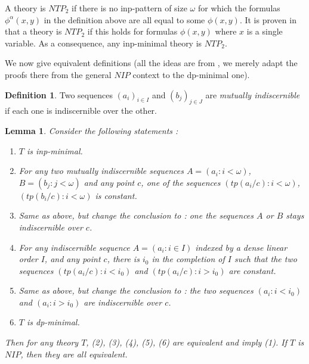 \documentclass[english]{article}
\newtheorem{lemme}[thm]{Lemma}
\theoremstyle{definition}
\newtheorem{defi}[thm]{Definition}
\theoremstyle{mystyle}
\theoremstyle{remark}
\begin{document}
A theory is $NTP_2$ if there is no inp-pattern of size $\omega$ for which the formulas $\phi^\alpha(x,y)$ in the definition above are all equal to some $\phi(x,y)$. It is proven in \cite{ntp2} that a theory is $NTP_2$ if this holds for formulas $\phi(x,y)$ where $x$ is a single variable. As a consequence, any inp-minimal theory is $NTP_2$.

We now give equivalent definitions (all the ideas are from \cite{Sh863}, we merely adapt the proofs there from the general $NIP$ context to the dp-minimal one).

\begin{defi}
Two sequences $(a_i)_{i \in I}$ and $(b_j)_{j\in J}$ are \emph{mutually indiscernible} if each one is indiscernible over the other.
\end{defi}

\begin{lemme}\label{defs}
Consider the following statements : 
\begin{enumerate}
\item $T$ is inp-minimal.
\item For any two mutually indiscernible sequences $A=(a_i : i< \omega)$, $B=(b_j : j<\omega)$ and any point $c$, one of the sequences $(tp(a_i/c) : i < \omega)$, $(tp(b_i/c) : i < \omega)$ is constant.
\item Same as above, but change the conclusion to : one the sequences $A$ or $B$ stays indiscernible over $c$.
\item For any indiscernible sequence $A=(a_i : i \in I)$ indexed by a dense linear order $I$, and any point $c$, there is $i_0$ in the completion of $I$ such that the two sequences $(tp(a_i/c) : i<i_0)$ and $(tp(a_i/c) : i>i_0)$ are constant.
\item Same as above, but change the conclusion to : the two sequences $(a_i : i<i_0)$ and $(a_i : i>i_0)$ are indiscernible over $c$.
\item $T$ is dp-minimal.
\end{enumerate}
Then for any theory $T$, (2), (3), (4), (5), (6) are equivalent and imply (1). If $T$ is $NIP$, then they are all equivalent.
\end{lemme}
\end{document}
